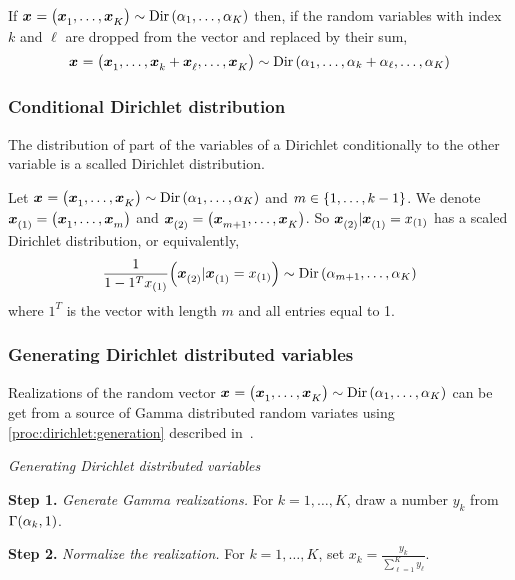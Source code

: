 \begin{prop}\label{prop:dirichlet:aggregation}
  If $\va x=\bracket{\va x_1,\ldots,\va x_K}\sim \Dir\bracket{\alpha_1,\ldots,\alpha_K}$ then, if the random variables with index $k$ and $\ell$ are dropped from the vector and replaced by their sum,
  $$\va x=\bracket{\va x_1,\ldots,\va x_k+\va x_{\ell},\ldots,\va x_K}\sim \Dir\bracket{\alpha_1,\ldots,\alpha_k+\alpha_{\ell},\ldots,\alpha_K}$$
\end{prop}


\subsubsection{Conditional Dirichlet distribution}


The distribution of part of the variables of a Dirichlet conditionally to the other variable is a scalled Dirichlet distribution.


\begin{prop}\label{prop:dirichlet:conditional}
  Let $\va x=\bracket{\va x_1,\ldots,\va x_K}\sim \Dir\bracket{\alpha_1,\ldots,\alpha_K}$ and $m\in\range[1]{k-1}$.
  We denote $\va x_{(1)}=\bracket{\va x_1,\ldots,\va x_m}$ and $\va x_{(2)}=\bracket{\va x_{m+1},\ldots,\va x_K}$.
  So $\va x_{(2)}|\va x_{(1)}=x_{(1)}$ has a scaled Dirichlet distribution, or equivalently,
  $$
  \frac{1}{1-1^T x_{(1)}} \bracket{\va x_{(2)}|\va x_{(1)}=x_{(1)}}
  \sim
  \Dir\bracket{\alpha_{m+1},\ldots,\alpha_K}
  $$
  where $1^T$ is the vector with length $m$ and all entries equal to 1.
\end{prop}




\subsubsection{Generating Dirichlet distributed variables}


Realizations of the random vector $\va x=\bracket{\va x_1,\ldots,\va x_K}\sim\Dir\bracket{\alpha_1,\ldots,\alpha_K}$ can be get from a source of Gamma distributed random variates using \cref{proc:dirichlet:generation} described in~\citet{Frigyik2010}.


\begin{proc}\label{proc:dirichlet:generation}
\emph{Generating Dirichlet distributed variables}

\textbf{Step 1.} \emph{Generate Gamma realizations.} For $k=1,\ldots,K$, draw a number $y_k$ from $\Gamma\bracket{\alpha_k,1}$.

\textbf{Step 2.} \emph{Normalize the realization.} For $k=1,\ldots,K$, set $x_k=\frac{y_k}{\sum_{\ell=1}^K y_{\ell}}$.
\end{proc}


